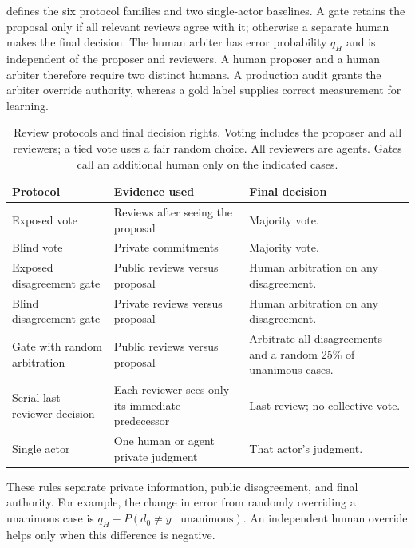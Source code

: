  defines the six protocol families and two single-actor baselines. A gate retains the proposal only if all relevant reviews agree with it; otherwise a separate human makes the final decision. The human arbiter has error probability $q_H$ and is independent of the proposer and reviewers. A human proposer and a human arbiter therefore require two distinct humans. A production audit grants the arbiter override authority, whereas a gold label supplies correct measurement for learning.
\begin{table}[!htbp]
\caption{Review protocols and final decision rights. Voting includes the proposer and all reviewers; a tied vote uses a fair random choice. All reviewers are agents. Gates call an additional human only on the indicated cases.}
\label{tab:actor-protocols}\small
\begin{tabularx}{\linewidth}{@{}p{.23\linewidth}YY@{}}\toprule
Protocol & Evidence used & Final decision \\\midrule
Exposed vote & Reviews after seeing the proposal & Majority vote. \\
Blind vote & Private commitments & Majority vote. \\
Exposed disagreement gate & Public reviews versus proposal & Human arbitration on any disagreement. \\
Blind disagreement gate & Private reviews versus proposal & Human arbitration on any disagreement. \\
Gate with random arbitration & Public reviews versus proposal & Arbitrate all disagreements and a random 25\% of unanimous cases. \\
Serial last-reviewer decision & Each reviewer sees only its immediate predecessor & Last review; no collective vote. \\
Single actor & One human or agent private judgment & That actor's judgment. \\\bottomrule
\end{tabularx}
\end{table}
These rules separate private information, public disagreement, and final authority. For example, the change in error from randomly overriding a unanimous case is $q_H-P(d_0\ne y\mid\text{unanimous})$. An independent human override helps only when this difference is negative.

